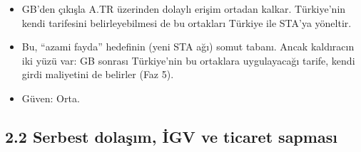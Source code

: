 \begin{enumerate}
\begin{itemize}
    \begin{itemize}
    \tightlist
    \item
      Hindistan \$6,8 mlr,
    \item
      Mercosur \$5,0 mlr,
    \item
      Japonya \$4,5 mlr,
    \item
      Vietnam \$3,0 mlr,
    \item
      Endonezya \$2,4 mlr.
    \end{itemize}
  \item
    GB'den çıkışla A.TR üzerinden dolaylı erişim ortadan kalkar. Türkiye'nin kendi tarifesini belirleyebilmesi de bu ortakları Türkiye ile STA'ya yöneltir.
  \item
    Bu, ``azami fayda'' hedefinin (yeni STA ağı) somut tabanı. Ancak kaldıracın iki yüzü var: GB sonrası Türkiye'nin bu ortaklara uygulayacağı tarife, kendi girdi maliyetini de belirler (Faz 5).
  \item
    \etiketT{} Güven: Orta.
  \end{itemize}
\end{enumerate}

\hypertarget{01_teshis-22-serbest-dolaux15fux131m-iux307gv-ve-ticaret-sapmasux131}{%
\subsection{2.2 Serbest dolaşım, İGV ve ticaret sapması}\label{01_teshis-22-serbest-dolaux15fux131m-iux307gv-ve-ticaret-sapmasux131}}

